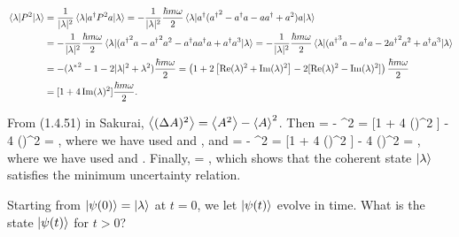 \begin{solution}
\begin{align}
		\ev{P^2}{\lam} &= \frac{1}{|\lam|^2} \ev{\ad P^2 a}{\lam}
		= -\frac{1}{|\lam|^2} \frac{\hbar m \omega}{2} \ev{\ad ({\ad}^2 - \ad a - a \ad + a^2) a}{\lam} \notag \\
		&= -\frac{1}{|\lam|^2} \frac{\hbar m \omega}{2} \ev{({\ad}^2 a - {\ad}^2 a^2 - \ad a \ad a + \ad a^3}{\lam}
		= -\frac{1}{|\lam|^2} \frac{\hbar m \omega}{2} \ev{({\ad}^3 a - \ad a - 2 {\ad}^2 a^2 + \ad a^3}{\lam} \notag \\
		&= -({\lam^*}^2 - 1 - 2 |\lam|^2 + \lam^2) \frac{\hbar m \omega}{2}
		= \left( 1 + 2 \left[ \Re(\lam)^2 + \Im(\lam)^2 \right] - 2 [\Re(\lam)^2 - \Im(\lam)^2] 
\right) \frac{\hbar m \omega}{2} \notag \\
		&= [1 + 4 \Im(\lam)^2] \frac{\hbar m \omega}{2}. \label{evPsq}
	\end{align}
	
	From (1.4.51) in Sakurai, $\ev{(\DA)^2} = \ev{A^2} - \ev{A}^2$.  Then
	\beq
		 =  - ^2 = [1 + 4 \Re(\lam)^2 ]  - 4 \Re(\lam)^2  = ,
	\eeq
	where we have used  and , and
	\beq
		 =  - ^2 = [1 + 4 \Im(\lam)^2 ]  - 4 \Im(\lam)^2  = ,
	\eeq
	where we have used  and .  Finally,
	\beq
		  = ,
	\eeq
	which shows that the coherent state $\ket{\lambda}$ satisfies the minimum uncertainty relation.
\end{solution}


\newcommand{\psit}{\psi(t)}
\newcommand{\kpsit}{\ket{\psit}}
\newcommand{\Ut}{U(t)}
\newcommand{\lamt}{\lam e^{-i \omega t}}
\newcommand{\klamt}{\ket{\lamt}}
\newcommand{\blamt}{\bra{\lamt}}

\begin{problem} \label{timeevo}
	Starting from $\ket{\psi(0)} = \ket{\lambda}$ at $t = 0$, we let $\kpsit$ evolve in time.  What is the state $\kpsit$ for $t > 0$?
\end{problem}

